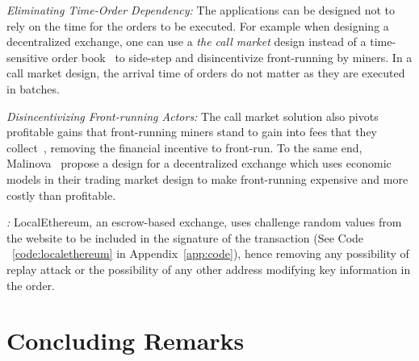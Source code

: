 \begin{compactlist}

\item \emph{Eliminating Time-Order Dependency:} The applications can be designed not to rely on the time for the orders to be executed. For example when designing a decentralized exchange, one can use a \emph{the call market} design instead of a time-sensitive order book~\cite{clark2014decentralizing} to side-step and disincentivize front-running by miners. In a call market design, the arrival time of orders do not matter as they are executed in batches. 

\item \emph{Disincentivizing Front-running Actors:} The call market solution also pivots profitable gains that front-running miners stand to gain into fees that they collect~\cite{clark2014decentralizing}, removing the financial incentive to front-run. To the same end, Malinova~\cite{malinova2017market} propose a design for a decentralized exchange which uses economic models in their trading market design to make front-running expensive and more costly than profitable. 

\item \emph{:} LocalEthereum, an escrow-based exchange, uses challenge random values from the website to be included in the signature of the transaction (See Code ~\ref{code:localethereum} in Appendix~\ref{app:code}), hence removing any possibility of replay attack or the possibility of any other address modifying key information in the order. 

 \end{compactlist}





\section{Concluding Remarks}

